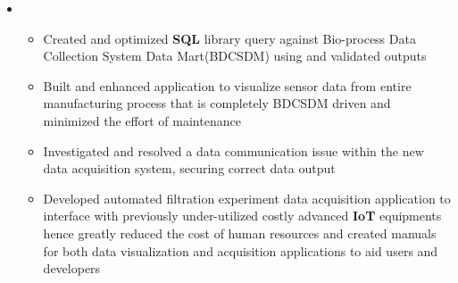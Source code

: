 \documentclass[11pt,a4paper,sans]{moderncv}        %
\begin{document}
\begin{itemize}
	\item{
		{\vspace{3pt}
		    \begin{itemize} pt
				\item Created and optimized \textbf{SQL} library query against Bio-process Data Collection System Data Mart(BDCSDM) using and validated outputs  %
				\item Built and enhanced application to visualize sensor data from entire manufacturing process that is completely BDCSDM driven and minimized the effort of maintenance
				\item Investigated and resolved a data communication issue within the new data acquisition system, securing correct data output%
				\item Developed automated filtration experiment data acquisition application to interface with previously under-utilized costly advanced \textbf{IoT} equipments hence greatly reduced the cost of human resources and created manuals for both data visualization and acquisition applications to aid users and developers
			\end{itemize}}}

\end{itemize}

\end{document}
